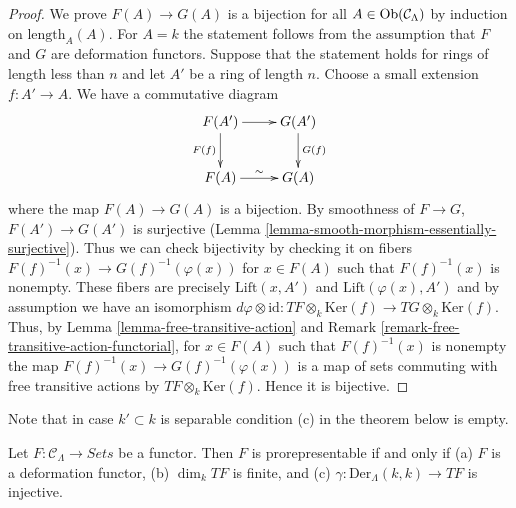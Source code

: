 \begin{proof}
We prove $F(A) \to G(A)$ is a bijection for all $A \in
\mathop{\rm Ob}\nolimits(\mathcal{C}_\Lambda)$ by induction on
$\text{length}_A(A)$.  For $A = k$ the statement follows from the
assumption that $F$ and $G$ are deformation functors. Suppose that the
statement holds for rings of length less than $n$ and let $A'$ be a ring of
length $n$. Choose a small extension $f : A' \to A$.  We have a
commutative diagram
$$
\xymatrix{
F(A') \ar[r] \ar[d]_{F(f)} & G(A') \ar[d]^{G(f)} \\
F(A) \ar[r]^{\sim} & G(A)
}
$$
where the map $F(A) \to G(A)$ is a bijection.  By smoothness of $F
\to G$, $F(A') \to G(A')$ is surjective (Lemma
\ref{lemma-smooth-morphism-essentially-surjective}).  Thus we can check
bijectivity by checking it on fibers $F(f)^{-1}(x) \to
G(f)^{-1}(\varphi(x))$ for $x \in F(A)$ such that $F(f)^{-1}(x)$ is nonempty.
These fibers are precisely $\text{Lift}(x, A')$ and
$\text{Lift}(\varphi(x), A')$ and by assumption we have an isomorphism
$d\varphi \otimes \text{id} :
TF \otimes_k \text{Ker}(f)  \to TG \otimes_k \text{Ker}(f)$.
Thus, by
Lemma \ref{lemma-free-transitive-action} and
Remark \ref{remark-free-transitive-action-functorial},
for $x \in F(A)$ such that $F(f)^{-1}(x)$ is nonempty the map
$F(f)^{-1}(x) \to G(f)^{-1}(\varphi(x))$ is a map of sets commuting
with free transitive actions by $TF \otimes_k \text{Ker}(f)$.
Hence it is bijective.
\end{proof}

\noindent
Note that in case $k' \subset k$ is separable condition (c) in
the theorem below is empty.

\begin{theorem}
\label{theorem-Schlessinger-prorepresentability}
Let $F: \mathcal{C}_\Lambda \to \textit{Sets}$ be a functor.
Then $F$ is prorepresentable if and only if
(a) $F$ is a deformation functor,
(b) $\dim_k TF$ is finite, and (c) $\gamma : \text{Der}_\Lambda(k, k) \to TF$
is injective.
\end{theorem}

